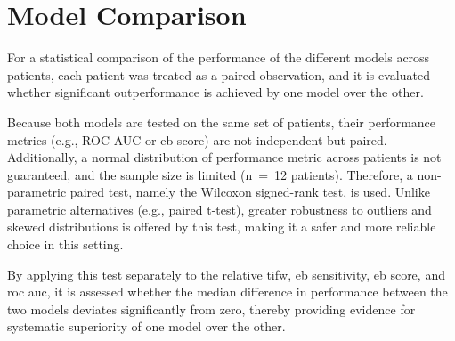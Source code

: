 \section{Model Comparison}\label{sec:model-comparison}
For a statistical comparison of the performance of the different models across patients, each patient was treated as a paired observation, and it is evaluated whether significant outperformance is achieved by one model over the other.

Because both models are tested on the same set of patients, their performance metrics (e.g., ROC AUC or \gls{eb} score) are not independent but paired.
Additionally, a normal distribution of performance metric across patients is not guaranteed, and the sample size is limited (n~=~12 patients).
Therefore, a non-parametric paired test, namely the Wilcoxon signed-rank test, is used.
Unlike parametric alternatives (e.g., paired t-test), greater robustness to outliers and skewed distributions is offered by this test, making it a safer and more reliable choice in this setting.

By applying this test separately to the relative \gls{tifw}, \gls{eb} sensitivity, \gls{eb} score, and \gls{roc auc}, it is assessed whether the median difference in performance between the two models deviates significantly from zero, thereby providing evidence for systematic superiority of one model over the other.